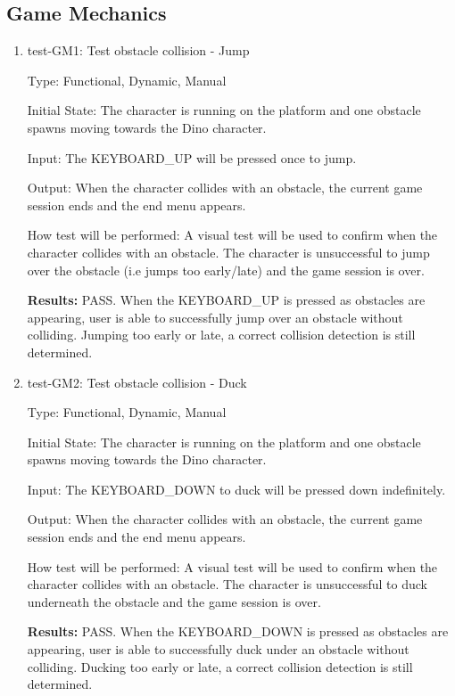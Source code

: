 \documentclass[12pt, titlepage]{article}
\begin{document}
\subsection{Game Mechanics}
\begin{enumerate}

\item{test-GM1: Test obstacle collision - Jump\\}

Type: Functional, Dynamic, Manual
					
Initial State: The character is running on the platform and one obstacle spawns moving towards the Dino character.
					
Input: The KEYBOARD\_UP will be pressed once to jump.
					
Output: When the character collides with an obstacle, the current game session ends and the end menu appears.
					
How test will be performed: A visual test will be used to confirm when the character collides with an obstacle. The character is unsuccessful to jump over the obstacle (i.e jumps too early/late) and the game session is over.

\textbf{Results:} PASS. When the KEYBOARD\_UP is pressed as obstacles are appearing, user is able to successfully jump over an obstacle without colliding. Jumping too early or late, a correct collision detection is still determined. 

\item{test-GM2: Test obstacle collision - Duck\\}

Type: Functional, Dynamic, Manual
					
Initial State: The character is running on the platform and one obstacle spawns moving towards the Dino character.
					
Input: The  KEYBOARD\_DOWN to duck will be pressed down indefinitely.
					
Output: When the character collides with an obstacle, the current game session ends and the end menu appears.
					
How test will be performed: A visual test will be used to confirm when the character collides with an obstacle. The character is unsuccessful to duck underneath the obstacle and the game session is over.

\textbf{Results:} PASS. When the KEYBOARD\_DOWN is pressed as obstacles are appearing, user is able to successfully duck under an obstacle without colliding. Ducking too early or late, a correct collision detection is still determined. 


\end{enumerate}
\end{document}
